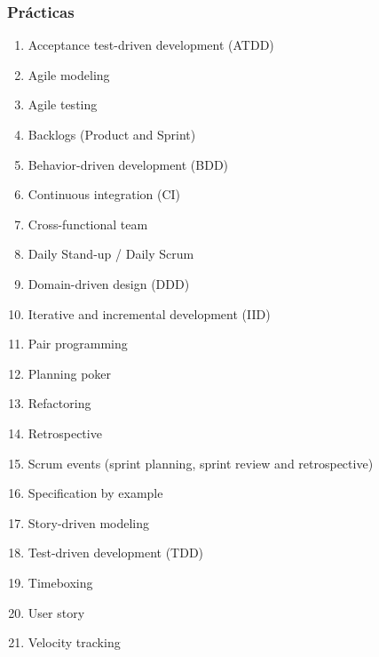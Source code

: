     \subsubsection{Prácticas}

    \begin{enumerate}
        \item Acceptance test-driven development (ATDD)
        \item Agile modeling
        \item Agile testing
        \item Backlogs (Product and Sprint)
        \item Behavior-driven development (BDD)
        \item Continuous integration (CI)
        \item Cross-functional team
        \item Daily Stand-up / Daily Scrum
        \item Domain-driven design (DDD)
        \item Iterative and incremental development (IID)
        \item Pair programming
        \item Planning poker
        \item Refactoring
        \item Retrospective
        \item Scrum events (sprint planning, sprint review and retrospective)
        \item Specification by example
        \item Story-driven modeling
        \item Test-driven development (TDD)
        \item Timeboxing
        \item User story
        \item Velocity tracking
    \end{enumerate}

